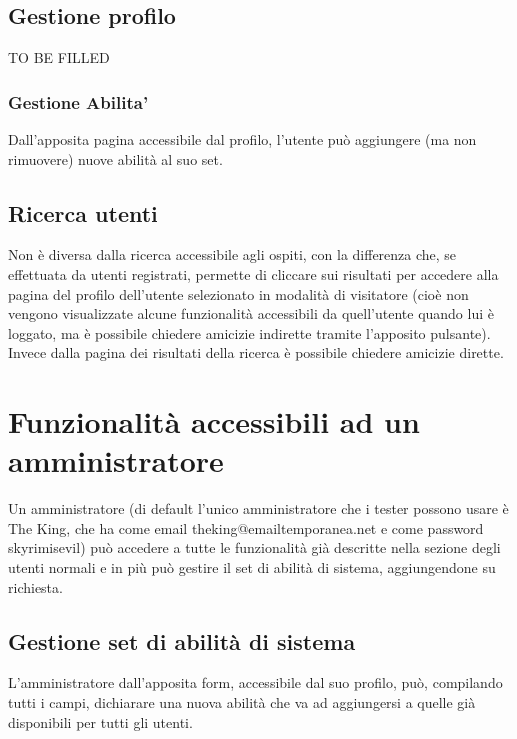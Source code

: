 \documentclass[a4paper,12pt]{article}
\begin{document}
\subsection{Gestione profilo}
TO BE FILLED

\subsubsection{Gestione Abilita'}
Dall'apposita pagina accessibile dal profilo, l'utente può aggiungere (ma non rimuovere) nuove abilità al suo set.

\subsection{Ricerca utenti}
Non è diversa dalla ricerca accessibile agli ospiti, con la differenza che, se effettuata da utenti registrati, permette di cliccare sui risultati per accedere alla pagina del profilo
dell'utente selezionato in modalità di visitatore (cioè non vengono visualizzate alcune funzionalità accessibili da quell'utente quando lui è loggato, ma è possibile chiedere amicizie
indirette tramite l'apposito pulsante). Invece dalla pagina dei risultati della ricerca è possibile chiedere amicizie dirette.

\section{Funzionalità accessibili ad un amministratore}

Un amministratore (di default l'unico amministratore che i tester possono usare è The King, che ha come email theking@emailtemporanea.net e come password skyrimisevil) può accedere a
tutte le funzionalità già descritte nella sezione degli utenti normali e in più può gestire il set di abilità di sistema, aggiungendone su richiesta.

\subsection{Gestione set di abilità di sistema}

L'amministratore dall'apposita form, accessibile dal suo profilo, può, compilando tutti i campi, dichiarare una nuova abilità che va ad aggiungersi a quelle già disponibili per tutti gli utenti.
\end{document}
